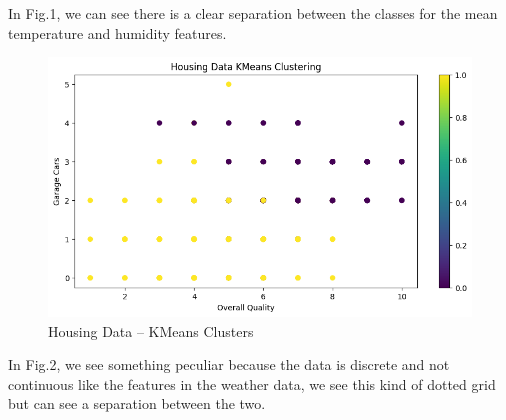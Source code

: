 \documentclass[conference]{IEEEtran}
\begin{document}
\par In Fig.1, we can see there is a clear separation between the classes for the mean temperature and humidity features. 
\begin{figure}
    \centering
    \includegraphics[width=1.0\linewidth]{figures//housing_figures/step_1c.png}
    \caption{Housing Data -- KMeans Clusters}
    \label{fig:2_housing_kmeans
}
\end{figure}
\par In Fig.2, we see something peculiar because the data is discrete and not continuous like the features in the weather data, we see this kind of dotted grid but can see a separation between the two.
\end{document}
